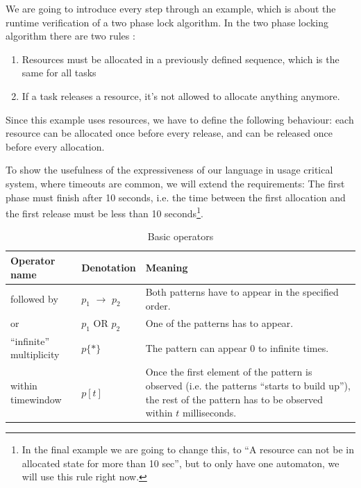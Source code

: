 		We are going to introduce every step through an example, which is about the runtime verification of a two phase lock algorithm. %
		In the two phase locking algorithm there are two rules :
		\begin{enumerate}
			\item Resources must be allocated in a previously defined sequence, which is the same for all tasks
			\item If a task releases a resource, it's not allowed to allocate anything anymore.
		\end{enumerate}
		
		Since this example uses resources, we have to define the following behaviour:
		each resource can be allocated once before every release, and can be released once before every allocation.
		
		To show the usefulness of the expressiveness of our language in usage critical system, where timeouts are common, we will extend the requirements:
		The first phase must finish after 10 seconds,
		i.e. the time between the first allocation and the first release must be less than 10 seconds\footnote{In the final 
		example we are going to change this, to ``A resource can not be in allocated state for more than 10 sec'', but to 
		only have one automaton, we will use this rule right now.}.
		
			
		\begin{table}
		\caption{Basic operators}		
		\label{tab:cep:veplop}
			\begin{tabularx}{\textwidth}{llX}
				\toprule
				Operator name &	Denotation & Meaning \\
				\midrule
				followed by & $p_1$ $\rightarrow$ $p_2$ & Both patterns have to appear in the specified order. \\
				or & $p_1$ OR $p_2$ &	One of the patterns has to appear. \\
				``infinite'' multiplicity & $p\{\ast\}$ & The pattern can appear 0 to infinite times. \\
				within timewindow &	$p[t]$ & Once the first element of the pattern is observed (i.e. the patterns ``starts to build up''), the rest of the pattern has to be observed within $t$ milliseconds. \\
				\bottomrule
			\end{tabularx}
		\end{table}

